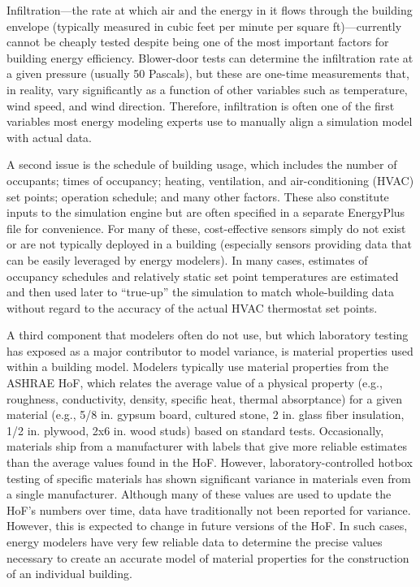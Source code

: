 \documentclass[preprint, review, 12pt]{elsarticle}
\begin{document}
Infiltration---the rate at which air and the energy in it flows through the building envelope (typically measured in cubic feet per minute per square ft)---currently cannot be cheaply tested despite being one of the most important factors for building energy efficiency. Blower-door tests can determine the infiltration rate at a given pressure (usually 50 Pascals), but these are one-time measurements that, in reality, vary significantly as a function of other variables such as temperature, wind speed, and wind direction. Therefore, infiltration is often one of the first variables most energy modeling experts use to manually align a simulation model with actual data.

A second issue is the schedule of building usage, which includes the number of occupants; times of occupancy; heating, ventilation, and air-conditioning (HVAC) set points; operation schedule; and many other factors. These also constitute inputs to the simulation engine but are often specified in a separate EnergyPlus file for convenience. For many of these, cost-effective sensors simply do not exist or are not typically deployed in a building (especially sensors providing data that can be easily leveraged by energy modelers). In many cases, estimates of occupancy schedules and relatively static set point temperatures are estimated and then used later to ``true-up'' the simulation to match whole-building data without regard to the accuracy of the actual HVAC thermostat set points.

A third component that modelers often do not use, but which laboratory testing has exposed as a major contributor to model variance, is material properties used within a building model. Modelers typically use material properties from the ASHRAE HoF, which relates the average value of a physical property (e.g., roughness, conductivity, density, specific heat, thermal absorptance) for a given material (e.g., 5/8 in. gypsum board, cultured stone, 2 in. glass fiber insulation, 1/2 in. plywood, 2x6 in. wood studs) based on standard tests. Occasionally, materials ship from a manufacturer with labels that give more reliable estimates than the average values found in the HoF. However, laboratory-controlled hotbox testing of specific materials has shown significant variance in materials even from a single manufacturer. Although many of these values are used to update the HoF's numbers over time, data have traditionally not been reported for variance. However, this is expected to change in future versions of the HoF. In such cases, energy modelers have very few reliable data to determine the precise values necessary to create an accurate model of material properties for the construction of an individual building.
\end{document}
